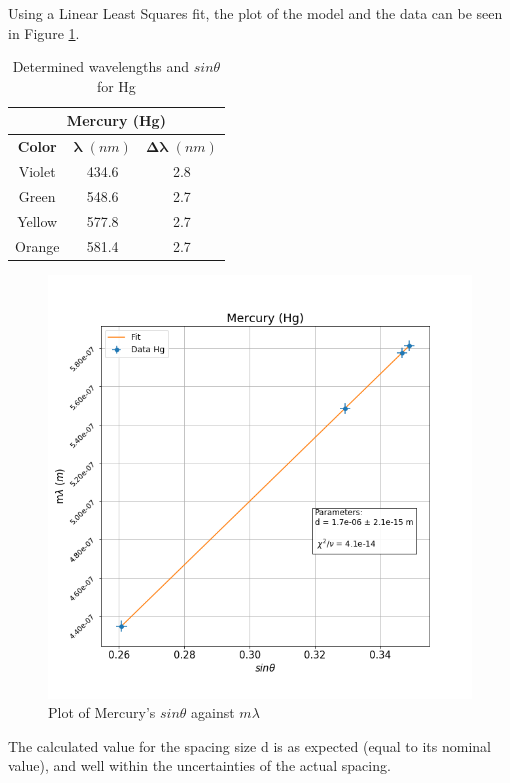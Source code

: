 \documentclass[a4paper, twocolumn]{article}
\begin{document}
Using a Linear Least Squares fit, the plot of the model and the data can be seen in Figure \ref{fig:mercury}.
\begin{table}[h!]
\centering
\begin{tabular}{ |c||c|c| }
 \hline
 \multicolumn{3}{|c|}{\textbf{Mercury (Hg)}} \\
 \hline
 \textbf{Color} & $\boldsymbol{\lambda}$ $(nm)$ & $\boldsymbol{\Delta\lambda}$ $(nm)$ \\
 \hline
 Violet & 434.6 & 2.8 \\
 \hline
 Green & 548.6 & 2.7 \\ 
 \hline
 Yellow & 577.8 & 2.7 \\
 \hline
 Orange & 581.4 & 2.7 \\
 \hline
\end{tabular}
\caption{Determined wavelengths and $sin\theta$ for Hg}
\label{table:lambdaHg}
\end{table}

\begin{figure}[h!]
 \centering
 \includegraphics[scale = 0.4]{mercury}
 \caption{Plot of Mercury's $sin\theta$ against $m\lambda$}
 \label{fig:mercury}
\end{figure}

The calculated value for the spacing size d is as expected (equal to its nominal value), and well within the uncertainties of the actual spacing.
\end{document}
